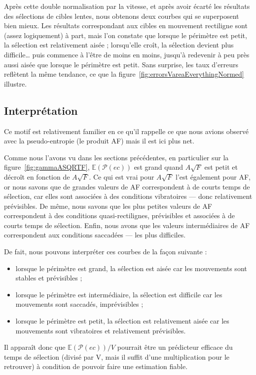 	Après cette double normalisation par la vitesse, et après avoir écarté les résultats des sélections de cibles lentes, nous obtenons deux courbes qui se superposent bien mieux. Les résultats correspondant aux cibles en mouvement rectiligne sont (assez logiquement) à part, mais l'on constate que lorsque le périmètre est petit, la sélection est relativement aisée ; lorsqu'elle croît, la sélection devient plus difficile\ldots{} puis commence à l'être de moins en moins, jusqu'à redevenir à peu près aussi aisée que lorsque le périmètre est petit. Sans surprise, les taux d'erreurs reflètent la même tendance, ce que la figure~\ref{fig:errorsVareaEverythingNormed} illustre.
	
	\subsection{Interprétation}
	Ce motif est relativement familier en ce qu'il rappelle ce que nous avions observé avec la pseudo-entropie (le produit AF) mais il est ici plus net.
	
	Comme nous l'avons vu dans les sections précédentes, en particulier sur la figure~\ref{fig:gammaASQRTF}, $\mathbb{E}(\mathcal{P}(ec))$ est grand quand $A\sqrt{F}$ est petit et décroît en fonction de $A\sqrt{F}$. Ce qui est vrai pour $A\sqrt{F}$ l'est également pour AF, or nous savons que de grandes valeurs de AF correspondent à de courts temps de sélection, car elles sont associées à des conditions vibratoires --- donc relativement prévisibles. De même, nous savons que les plus petites valeurs de AF correspondent à des conditions quasi-rectilignes, prévisibles et associées à de courts temps de sélection. Enfin, nous avons que les valeurs intermédiaires de AF correspondent aux conditions saccadées --- les plus difficiles.
	
	De fait, nous pouvons interpréter ces courbes de la façon suivante :
	\begin{itemize}
		\item lorsque le périmètre est grand, la sélection est aisée car les mouvements sont stables et prévisibles ;
		\item lorsque le périmètre est intermédiaire, la sélection est difficile car les mouvements sont saccadés, imprévisibles ;
		\item lorsque le périmètre est petit, la sélection est relativement aisée car les mouvements sont vibratoires et relativement prévisibles.
	\end{itemize}
	
	Il apparaît donc que $\mathbb{E}(\mathcal{P}(ec))/V$ pourrait être un prédicteur efficace du temps de sélection (divisé par V, mais il suffit d'une multiplication pour le retrouver) à condition de pouvoir faire une estimation fiable.
	
